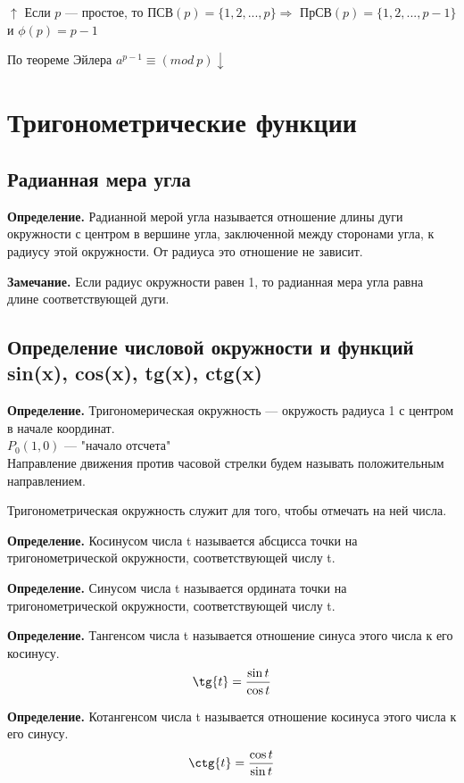 \documentclass{article}
\begin{document}
            $\uparrow$ Если $p$ --- простое, то ПСВ$(p) = \{1,2,...,p\} \Rightarrow$ ПрСВ$(p) = \{1,2,...,p-1\}$ и $\phi(p)=p - 1$
            
            По теореме Эйлера $a^{p-1} \equiv (mod\ p) \downarrow$
            
    \section{Тригонометрические функции}
     	\subsection{Радианная мера угла}
        
        \textbf{Определение.} Радианной мерой угла называется отношение длины дуги окружности с центром в вершине угла, заключенной между сторонами угла, к радиусу этой окружности. От радиуса это отношение не зависит.
    
    	\textbf{Замечание.} Если радиус окружности равен 1, то радианная мера угла равна длине соответствующей дуги.
        
        \subsection{Определение числовой окружности и функций sin(x), cos(x), tg(x), ctg(x)}
        
        \textbf{Определение.}  Тригономерическая окружность --- окружость радиуса 1 с центром в начале координат.
        \\ \(P_0(1, 0)\) --- "начало отсчета"
        \\Направление движения против часовой стрелки будем называть положительным направлением.
        
        Тригонометрическая окружность служит для того, чтобы отмечать на ней числа.
        
        \textbf{Определение.} Косинусом числа t называется абсцисса точки на тригонометрической окружности, соответствующей числу t.
        
        \textbf{Определение.} Синусом числа t называется ордината точки на тригонометрической окружности, соответствующей числу t.
        
        \textbf{Определение.} Тангенсом числа t называется отношение синуса этого числа к его косинусу.
        \[\tg{t} = \frac{\sin{t}}{\cos{t}}\]
      
        \textbf{Определение.} Котангенсом числа t называется отношение косинуса этого числа к его синусу.
        \[\ctg{t} = \frac{\cos{t}}{\sin{t}}\]
        
\end{document}
